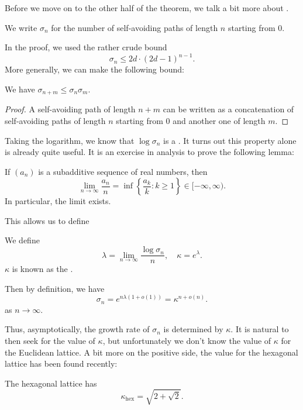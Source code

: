 \documentclass[a4paper]{article}
\begin{document}
Before we move on to the other half of the theorem, we talk a bit more about .
\begin{defi}[$\sigma_n$]
  We write $\sigma_n$ for the number of self-avoiding paths of length $n$ starting from $0$.
\end{defi}
In the proof, we used the rather crude bound
\[
  \sigma_n \leq 2d \cdot (2d - 1)^{n - 1}.
\]
More generally, we can make the following bound:

\begin{lemma}
  We have $\sigma_{n + m} \leq \sigma_n \sigma_m$.
\end{lemma}

\begin{proof}
  A self-avoiding path of length $n + m$ can be written as a concatenation of self-avoiding paths of length $n$ starting from $0$ and another one of length $m$.
\end{proof}
Taking the logarithm, we know that $\log \sigma_n$ is a . It turns out this property alone is already quite useful. It is an exercise in analysis to prove the following lemma:

\begin{lemma}
  If $(a_n)$ is a subadditive sequence of real numbers, then
  \[
    \lim_{n \to \infty} \frac{a_n}{n} = \inf\left\{\frac{a_k}{k}: k \geq 1\right\} \in [-\infty, \infty).
  \]
  In particular, the limit exists.
\end{lemma}

This allows us to define
\begin{defi}\index{$\lambda$}\index{$\kappa$}
  We define
  \[
    \lambda = \lim_{n \to \infty} \frac{\log \sigma_n}{n},\quad \kappa = e^\lambda.
  \]
  $\kappa$ is known as the .
\end{defi}

Then by definition, we have
\[
  \sigma_n= e^{n \lambda (1 + o(1))} = \kappa^{n + o(n)}.
\]
as $n \to \infty$.

Thus, asymptotically, the growth rate of $\sigma_n$ is determined by $\kappa$. It is natural to then seek for the value of $\kappa$, but unfortunately we don't know the value of $\kappa$ for the Euclidean lattice. A bit more on the positive side, the value for the hexagonal lattice has been found recently:
\begin{thm}
  The hexagonal lattice has
  \[
    \kappa_{\mathrm{hex}} = \sqrt{2 + \sqrt{2}}.
  \]
\end{thm}
\end{document}
